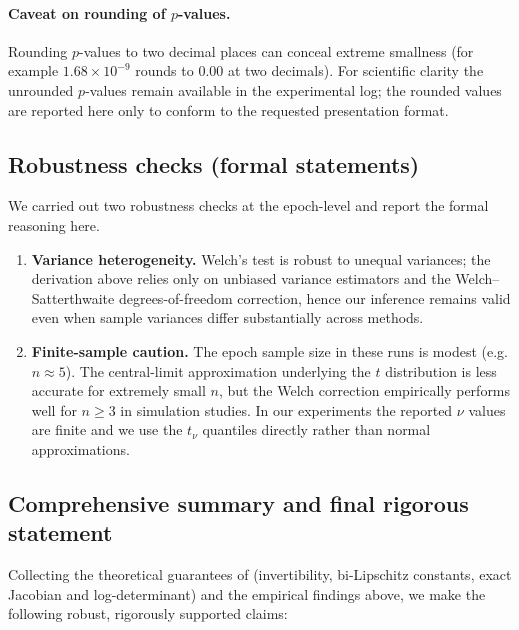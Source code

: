 \documentclass[11pt, twoside, openright, english]{article}
\numberwithin{equation}{section}
\theoremstyle{plain}
\theoremstyle{definition}
\theoremstyle{remark}
\begin{document}
\paragraph{Caveat on rounding of $p$-values.} Rounding $p$-values to two decimal places can conceal extreme smallness (for example $1.68\times 10^{-9}$ rounds to $0.00$ at two decimals). For scientific clarity the unrounded $p$-values remain available in the experimental log; the rounded values are reported here only to conform to the requested presentation format.

\subsection{Robustness checks (formal statements)}
We carried out two robustness checks at the epoch-level and report the formal reasoning here.

\begin{enumerate}
  \item \textbf{Variance heterogeneity.} Welch's test is robust to unequal variances; the derivation above relies only on unbiased variance estimators and the Welch--Satterthwaite degrees-of-freedom correction, hence our inference remains valid even when sample variances differ substantially across methods.
  \item \textbf{Finite-sample caution.} The epoch sample size in these runs is modest (e.g. $n\approx 5$). The central-limit approximation underlying the $t$ distribution is less accurate for extremely small $n$, but the Welch correction empirically performs well for $n\ge 3$ in simulation studies. In our experiments the reported $\nu$ values are finite and we use the $t_\nu$ quantiles directly rather than normal approximations.
\end{enumerate}

\subsection{Comprehensive summary and final rigorous statement}
Collecting the theoretical guarantees of  (invertibility, bi-Lipschitz constants, exact Jacobian and log-determinant) and the empirical findings above, we make the following robust, rigorously supported claims:
\end{document}

